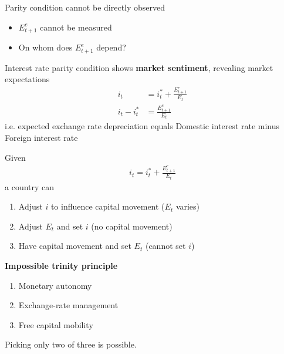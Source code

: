 \documentclass{beamer}
\begin{document}
\begin{frame}
  Parity condition cannot be directly observed
  \begin{itemize}
    \item $E^e_{t+1}$ cannot be measured
    \item On whom does $E^e_{t+1}$ depend? 
  \end{itemize}  
 Interest rate parity condition shows \textbf{market sentiment}, revealing market expectations
  \begin{align}
      i_t &= i^*_t +  \frac{E^e_{t+1}}{E_t}\\ \nonumber
      i_t - i^*_t  &= \frac{E^e_{t+1}}{E_t}
  \end{align}
  i.e. expected exchange rate depreciation equals Domestic interest rate minus Foreign interest rate  
\end{frame}

\begin{frame}
  Given 
  \begin{align}
    i_t = i^*_t +  \frac{E^e_{t+1}}{E_t}
  \end{align}
   a country can 
  \begin{enumerate}
    \item Adjust $i$ to influence capital movement ($E_t$ varies)
    \item Adjust $E_t$ and set $i$ (no capital movement)
    \item Have capital movement and set $E_t$ (cannot set $i$)
  \end{enumerate}
\end{frame}

\begin{frame}
  \textbf{Impossible trinity principle}
  \begin{enumerate}
    \item Monetary autonomy
    \item Exchange-rate management
    \item Free capital mobility    
  \end{enumerate}
  \medskip
  Picking only two of three is possible.
\end{frame}
\end{document}
